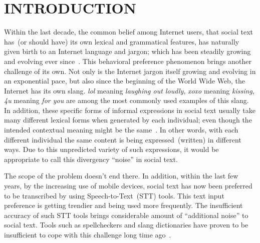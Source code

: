 \documentclass[a4paper,onesided,12pt]{report}
\begin{document}
\begin{abbreviations}
\sym{}{}
\sym{}{}
\sym{}{}
\sym{}{}
\end{abbreviations}


\chapter{INTRODUCTION}
\label{chapter:introduction}
Within the last decade, the common belief among Internet users, that social text has~(or should have) its own lexical and grammatical features, has naturally given birth to an Internet language and jargon; which has been steadily growing and evolving ever since~\cite{Choudhury:2007:IMS:1326044.1326048, eisenstein2013bad}. This behavioral preference phenomenon brings another challenge of its own. Not only is the Internet jargon itself growing and evolving in an exponential pace, but also since the beginning of the World Wide Web, the Internet has its own slang. \textit{lol} meaning \textit{laughing out loudly},  \textit{xoxo} meaning \textit{kissing}, \textit{4u} meaning \textit{for you} are among the most commonly used examples of this slang. In addition, these specific forms of informal expressions in social text usually take many different lexical forms when generated by each individual; even though the intended contextual meaning might be the same~\cite{eisenstein2013bad}. In other words, with each different individual the same content is being expressed~(written) in different ways. Due to this unpredicted variety of such expressions, it would be appropriate to call this divergency ``noise'' in social text.

The scope of the problem doesn't end there. In addition, within the last few years, by the increasing use of mobile devices, social text has now been preferred to be transcribed by using Speech-to-Text~(STT) tools. This text input preference is getting trendier and being used more frequently. The insufficient accuracy of such STT tools brings considerable amount of ``additional noise'' to social text. Tools such as spellcheckers and slang dictionaries have proven to be insufficient to cope with this challenge long time ago~\cite{sproat2001normalization}.
\end{document}
